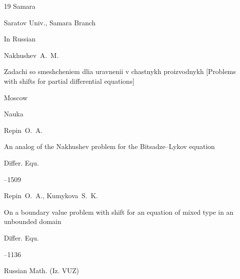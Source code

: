 \begin{thebibliography}{19}
\publaddr Samara

\publ Saratov Univ., Samara Branch








\lang In Russian

\by Nakhushev~A.~M.

\book Zadachi so smeshcheniem dlia uravnenii v chastnykh proizvodnykh \rm [Problems with shifts for partial differential equations]

\publaddr Moscow

\publ Nauka






\by Repin~O.~A.

\paper An analog of the Nakhushev problem for the Bitsadze--Lykov equation

\jour Differ. Equ. 



--1509 







\by Repin~O.~A., Kumykova~S.~K.

\paper On a boundary value problem with shift for an equation of mixed type in an unbounded domain

\jour Differ. Equ.




–1136  





\jour Russian Math. (Iz. VUZ)





\end{thebibliography}
